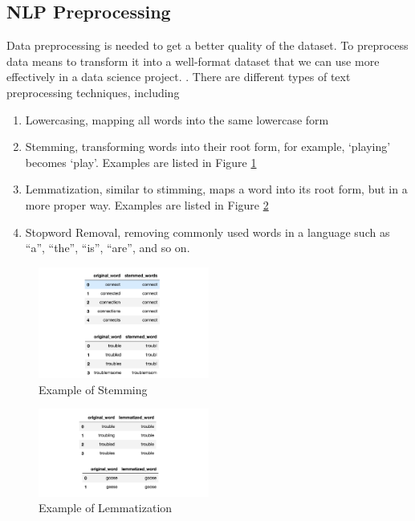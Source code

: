 \documentclass[12pt]{article}
\begin{document}
\subsection{NLP Preprocessing}
Data preprocessing is needed to get a better quality of the dataset. To preprocess data means to transform it into a well-format dataset that we can use more effectively in a data science project.   \cite{text_preprocessing_nlp}. There are different types of text preprocessing techniques, including
\begin{enumerate}
  \item Lowercasing, mapping all words into the same lowercase form
  \item Stemming, transforming words into their root form, for example, ‘playing’ becomes ‘play’. Examples are listed in Figure \ref{fig:stemming}
  \item Lemmatization, similar to stimming, maps a word into its root form, but in a more proper way. Examples are listed in Figure \ref{fig:lemmatization}
  \item Stopword Removal, removing commonly used words in a language such as “a”, “the”, “is”, “are”, and so on.
\end{enumerate}


\begin{figure}[!h]
    \centering
    \includegraphics[width=0.5\textwidth]{figures/stemming.png}
    \caption{Example of Stemming}
    \label{fig:stemming}
\end{figure}

\begin{figure}[!h]
    \centering
    \includegraphics[width=0.5\textwidth]{figures/lemmatize.png}
    \caption{Example of Lemmatization}
    \label{fig:lemmatization}
\end{figure}
\end{document}
